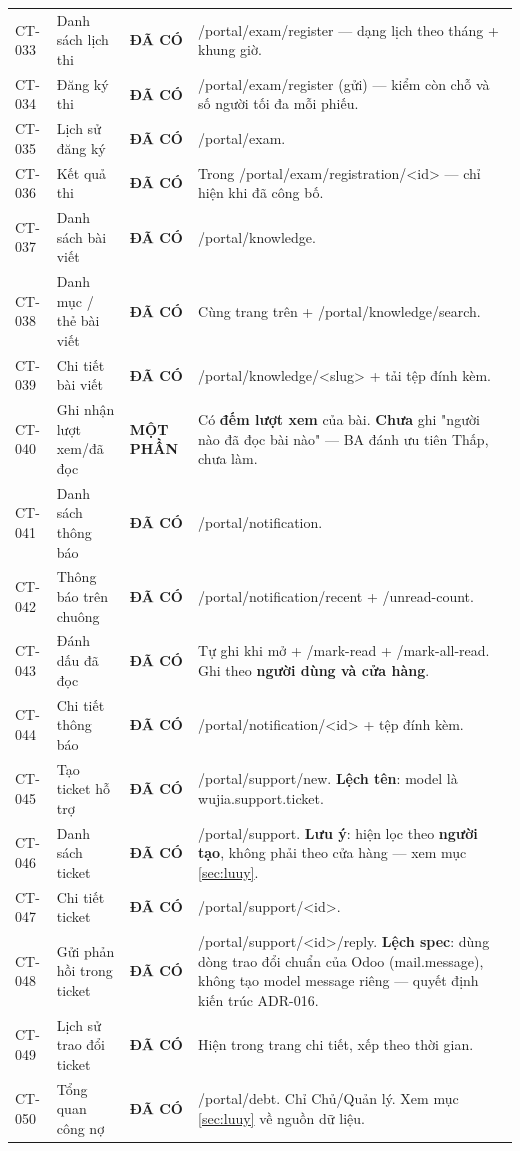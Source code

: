 \documentclass[11pt,a4paper]{report}
\newcommand{\ok}{\textcolor{okc}{\textbf{ĐÃ CÓ}}}
\newcommand{\pt}{\textcolor{partc}{\textbf{MỘT PHẦN}}}
\newcommand{\rt}[1]{{\ttfamily\footnotesize #1}}
\begin{document}
{\begin{longtable}{@{}L{1.2cm}L{4.2cm}L{1.9cm}L{7.6cm}@{}}
CT-033 & Danh sách lịch thi & \ok & \rt{/portal/exam/register} — dạng lịch theo tháng + khung giờ. \\
CT-034 & Đăng ký thi & \ok & \rt{/portal/exam/register} (gửi) — kiểm còn chỗ và số người tối đa mỗi phiếu. \\
CT-035 & Lịch sử đăng ký & \ok & \rt{/portal/exam}. \\
CT-036 & Kết quả thi & \ok & Trong \rt{/portal/exam/registration/<id>} — chỉ hiện khi đã công bố. \\
CT-037 & Danh sách bài viết & \ok & \rt{/portal/knowledge}. \\
CT-038 & Danh mục / thẻ bài viết & \ok & Cùng trang trên + \rt{/portal/knowledge/search}. \\
CT-039 & Chi tiết bài viết & \ok & \rt{/portal/knowledge/<slug>} + tải tệp đính kèm. \\
CT-040 & Ghi nhận lượt xem/đã đọc & \pt & Có \textbf{đếm lượt xem} của bài. \textbf{Chưa} ghi "người nào đã đọc bài nào" — BA đánh ưu tiên Thấp, chưa làm. \\
CT-041 & Danh sách thông báo & \ok & \rt{/portal/notification}. \\
CT-042 & Thông báo trên chuông & \ok & \rt{/portal/notification/recent} + \rt{/unread-count}. \\
CT-043 & Đánh dấu đã đọc & \ok & Tự ghi khi mở + \rt{/mark-read} + \rt{/mark-all-read}. Ghi theo \textbf{người dùng và cửa hàng}. \\
CT-044 & Chi tiết thông báo & \ok & \rt{/portal/notification/<id>} + tệp đính kèm. \\
CT-045 & Tạo ticket hỗ trợ & \ok & \rt{/portal/support/new}. \textbf{Lệch tên}: model là \rt{wujia.support.ticket}. \\
CT-046 & Danh sách ticket & \ok & \rt{/portal/support}. \textbf{Lưu ý}: hiện lọc theo \textbf{người tạo}, không phải theo cửa hàng — xem mục \ref{sec:luuy}. \\
CT-047 & Chi tiết ticket & \ok & \rt{/portal/support/<id>}. \\
CT-048 & Gửi phản hồi trong ticket & \ok & \rt{/portal/support/<id>/reply}. \textbf{Lệch spec}: dùng dòng trao đổi chuẩn của Odoo (\rt{mail.message}), không tạo model message riêng — quyết định kiến trúc ADR-016. \\
CT-049 & Lịch sử trao đổi ticket & \ok & Hiện trong trang chi tiết, xếp theo thời gian. \\
CT-050 & Tổng quan công nợ & \ok & \rt{/portal/debt}. Chỉ Chủ/Quản lý. Xem mục \ref{sec:luuy} về nguồn dữ liệu. \\

\end{longtable}}
\end{document}
